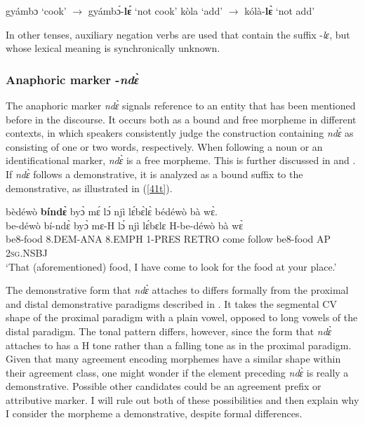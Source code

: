 \begin{exe} \ex \label{negle}
\begin{xlist}
\ex gyámbɔ `cook' $\rightarrow$ gyámbɔ́-{\bfseries lɛ́} `not cook'
\ex kòla `add' $\rightarrow$ kólà-{\bfseries lɛ̀} `not add'
\end{xlist}
\end{exe}

\noindent In other tenses, auxiliary negation verbs are used that contain the suffix -{\itshape lɛ}, but whose lexical meaning is synchronically unknown. 




\subsubsection{Anaphoric marker -{\itshape ndɛ̀}}
\label{sec:ANASuff}

The anaphoric marker {\itshape ndɛ̀} signals reference to an entity that has been mentioned before in the discourse. It occurs both as a  bound and free morpheme in different contexts, in which speakers consistently judge the construction containing   {\itshape ndɛ̀}  as consisting of one or two words, respectively.   When following a noun or an identificational marker, {\itshape ndɛ̀} is a free morpheme. This is further discussed in  and . If {\itshape ndɛ̀} follows a demonstrative, it is analyzed as a bound suffix to the demonstrative, as illustrated in (\ref{41t}).

\begin{exe} 
\ex\label{41t}
  \glll bèdéwò {\bfseries bíndɛ̀} byɔ̀ mɛ́ lɔ́ njì lɛ́bɛ̀lɛ̀ bédéwò bà wɛ̀.\\
        be-déwò bí-ndɛ̀ byɔ̀ mɛ-H lɔ́ njì lɛ́bɛlɛ H-be-déwò bà wɛ̀ \\
           be8-food 8.DEM-ANA 8.EMPH 1-PRES RETRO come  follow be8-food AP 2\textsc{sg}.NSBJ  \\
    \trans `That (aforementioned) food, I have come to look for the food at your place.'
\end{exe} 

The demonstrative form that {\itshape ndɛ̀} attaches to differs formally from the proximal and distal demonstrative paradigms described in . It takes the segmental CV shape of the proximal paradigm with a plain vowel, opposed to long vowels of the distal paradigm. The tonal pattern differs, however, since the form that {\itshape ndɛ̀} attaches to has a H tone rather than a falling tone as in the proximal paradigm. Given that many agreement encoding morphemes have a similar shape within their agreement class, one might wonder if the element preceding {\itshape ndɛ̀} is really a demonstrative. Possible other candidates could be an agreement prefix or attributive marker. I will rule out both of these possibilities  and then explain why I consider the morpheme a demonstrative, despite formal differences.

